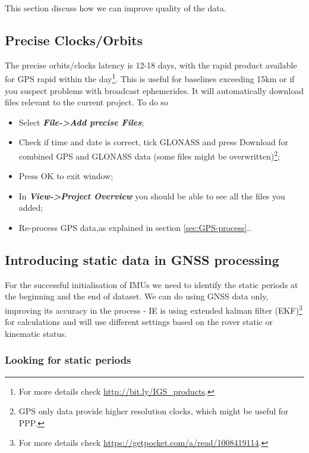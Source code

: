\documentclass[11pt,fleqn]{book} %
\newcommand{\moreInfo}[1]{\footnote{For more details check \url{#1}.}}
\newcommand*{\refLoc}[1]{as explained in section \ref{#1}.\xspace}
\begin{document}
This section discuss how we can improve quality of the data.


\subsection{Precise Clocks/Orbits}

The precise orbits/clocks latency is 12-18 days, with the rapid product available for GPS rapid within the day\moreInfo{http://bit.ly/IGS_products}. This is useful for baselines exceeding 15km or if you suspect problems with broadcast ephemerides. It will automatically download files relevant to the current project. To do so 

\begin{itemize}
	\item Select \textbf{\emph{File->Add precise Files}};
	\item Check if time and date is correct, tick GLONASS and press Download for combined GPS and GLONASS data (some files might be overwritten)\footnote{GPS only data provide higher resolution clocks, which might be useful for PPP.};
	\item Press OK to exit window;
	\item In \textbf{\emph{View->Project Overview}} you should be able to see all the files you added;
	\item Re-process GPS data,\refLoc{sec:GPS-process}.
\end{itemize}


\subsection{Introducing static data in GNSS processing}

For the successful initialisation of IMUs we need to identify the static periods at the beginning and the end of dataset. We can do using GNSS data only, improving its accuracy in the process - IE is using extended kalman filter (EKF)\moreInfo{https://getpocket.com/a/read/1008419114} for calculations and will use different settings based on the rover static or kinematic status.


\subsubsection{Looking for static periods\label{sec:Static-periods}}
\end{document}
